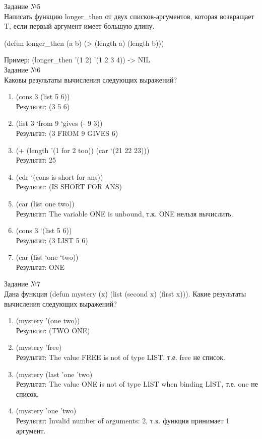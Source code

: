 {\LARGE Задание №5}\\

Написать функцию longer\_then от двух списков-аргументов, которая возвращает T, если первый аргумент имеет большую длину.

(defun longer\_then (a b) (> (length a) (length b)))

Пример: (longer\_then '(1 2) '(1 2 3 4)) -> NIL\\

{\LARGE Задание №6}\\

Каковы результаты вычисления следующих выражений?

\begin{enumerate}
\item (cons 3 (list 5 6))\\
Результат: (3 5 6)
\item (list 3 ‘from 9 ‘gives (- 9 3))\\
Результат: (3 FROM 9 GIVES 6)
\item (+ (length '(1 for 2 too)) (car ‘(21 22 23)))\\
Результат: 25
\item (cdr ‘(cons is short for ans))\\
Результат: (IS SHORT FOR ANS)
\item (car (list one two))\\
Результат: The variable ONE is unbound, т.к. ONE  нельзя вычислить.
\item (cons 3 ‘(list 5 6))\\
Результат: (3 LIST 5 6)
\item (car (list ‘one ‘two))\\
Результат: ONE\\
\end{enumerate}

{\LARGE Задание №7}\\

Дана функция (defun mystery (x) (list (second x) (first x))). Какие результаты вычисления следующих выражений?

\begin{enumerate}
\item (mystery '(one two))\\
Результат: (TWO ONE)
\item (mystery 'free)\\
Результат: The value FREE is not of type LIST, т.е. free не список.
\item (mystery (last 'one 'two)\\
Результат: The value ONE is not of type LIST when binding LIST, т.е. one не список.
\item (mystery 'one 'two)\\
Результат: Invalid number of arguments: 2, т.к. функция принимает 1 аргумент.
\end{enumerate}



